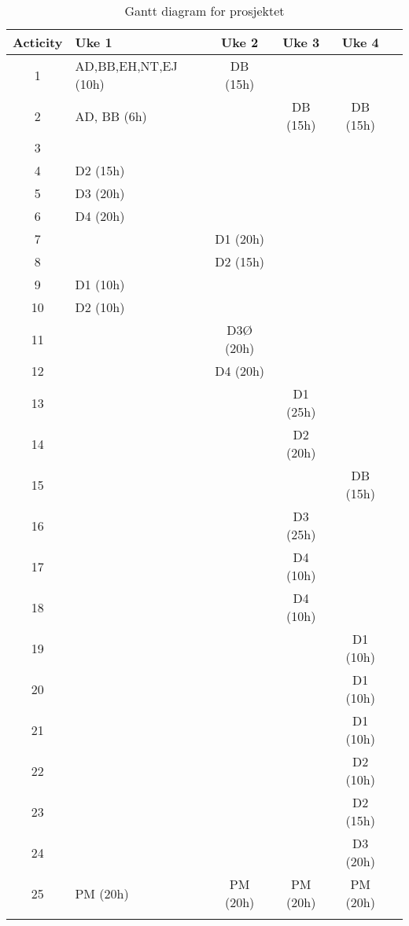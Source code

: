 
\small
	\begin{longtable}[l]{|c|l|c|c|c|c|}
	\hline
	\textbf{Acticity}& \textbf{Uke 1}& \textbf{Uke 2}& \textbf{Uke 3}& \textbf{Uke 4}\\ \hline
	1 	& AD,BB,EH,NT,EJ (10h)	& DB (15h) 	& 			& 			\\ 
	2 	& AD, BB (6h)	& 			& DB (15h)	& DB (15h)	\\ 
	3 	& 			& 			& 			& 			\\ 
	4 	& D2 (15h) 	& 			& 			& 			\\ 
	5 	& D3 (20h) 	& 			& 			& 			\\ 
	6 	& D4 (20h) 	& 			& 			& 			\\ 
	7 	& 			& D1 (20h) 	& 			& 			\\ 
	8 	& 			& D2 (15h) 	& 			& 			\\ 
	9 	& D1 (10h) 	& 			& 			& 			\\ 
	10 	& D2 (10h) 	& 			& 			& 			\\ 
	11 	& 			& D3Ø (20h) 	& 			&			\\ 
	12 	& 			& D4 (20h) 	& 			& 			\\ 
	13 	& 			& 			& D1 (25h) 	& 			\\ 
	14 	& 			& 			& D2 (20h) 	& 			\\ 
	15 	& 			& 			& 			& DB (15h) 	\\ 
	16 	& 			& 			& D3 (25h)	 	& 			\\
	17 	& 			& 			& D4 (10h) 	& 			\\ 
	18 	& 			& 			& D4 (10h) 	& 			\\ 
	19 	& 			& 			& 			& D1 (10h) 	\\ 
	20 	& 			& 			& 			& D1 (10h) 	\\ 
	21 	& 			& 			& 			& D1 (10h) 	\\ 
	22 	& 			& 			& 			& D2 (10h) 	\\ 
	23 	& 			& 			& 			& D2 (15h) 	\\ 
	24 	& 			& 			& 			& D3 (20h) 	\\ 
	25 	& PM (20h) 	& PM (20h) 	& PM (20h) 	& PM (20h) 	\\ \hline
	\caption {Gantt diagram for prosjektet}
	\end{longtable}